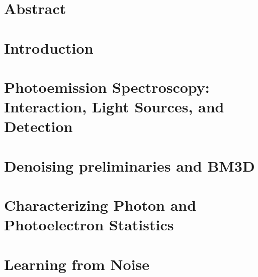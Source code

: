 \documentclass[a4paper,11pt,twoside,openany]{book}
\begin{document}

\chapter*{Abstract}

\tableofcontents

\printglossary[style=tree, type=\acronymtype, title=List of Acronyms]
\glsaddallunused[symbols]
\printglossary[type=symbols, style=tree, title=List of Symbols, nonumberlist]

\printglossary
\glsunsetall
\glsresetall

% 

\chapter{Introduction}


\chapter[Photoemission Spectroscopy: Interaction, Light Sources, and Detection]{Photoemission Spectroscopy:\\Interaction, Light Sources, and Detection}\label{ch:pes}


\chapter{Denoising preliminaries and BM3D}\label{ch:denoising}

% 

\chapter{Characterizing Photon and Photoelectron Statistics}\label{ch:pes-statistics}


\chapter{Learning from Noise}\label{ch:deep_learning}

\end{document}
